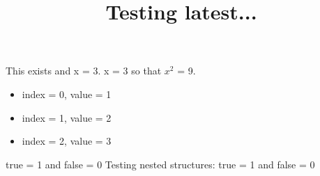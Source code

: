 \documentclass{article}
\title{Testing latest...}
\begin{document}
This exists and x = 3.
x = 3 so that $x^2$ = 9.
\begin{itemize}
\item index = 0, value = 1
\item index = 1, value = 2
\item index = 2, value = 3
\end{itemize}
true = 1 and false = 0
Testing nested structures:
true = 1 and false = 0
\end{document}
